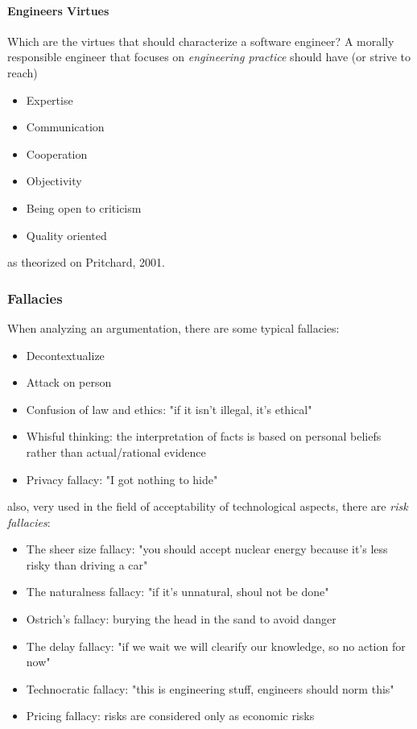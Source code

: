 \documentclass{article}
\begin{document}
				\paragraph{Engineers Virtues}
					Which are the virtues that should characterize a software engineer? A morally responsible engineer that focuses on \textit{engineering practice} should have (or strive to reach)
					\begin{itemize}
						\item Expertise
						\item Communication
						\item Cooperation
						\item Objectivity
				 		\item Being open to criticism
						\item Quality oriented
					\end{itemize}
					as theorized on Pritchard, 2001.

			\subsubsection{Fallacies}
				When analyzing an argumentation, there are some typical fallacies:
				\begin{itemize}
					\item Decontextualize
					\item Attack on person
					\item Confusion of law and ethics: "if it isn't illegal, it's ethical"
					\item Whisful thinking: the interpretation of facts is based on personal beliefs rather than actual/rational evidence
					\item Privacy fallacy: "I got nothing to hide"
				\end{itemize}
				also, very used in the field of acceptability of technological aspects, there are \textit{risk fallacies}:
				\begin{itemize}
					\item The sheer size fallacy: "you should accept nuclear energy because it's less risky than driving a car"
					\item The naturalness fallacy: "if it's unnatural, shoul not be done"
					\item Ostrich's fallacy: burying the head in the sand to avoid danger
					\item The delay fallacy: "if we wait we will clearify our knowledge, so no action for now"
					\item Technocratic fallacy: "this is engineering stuff, engineers should norm this"
					\item Pricing fallacy: risks are considered only as economic risks
				\end{itemize}
\end{document}
